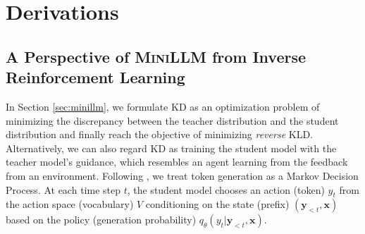 \documentclass{article}
\def\pst{q_{\theta}(y_t | \by_{<t}, \bx)}
\def\bx{\bm{x}}
\def\by{\bm{y}}
\begin{document}



\newpage
\appendix
\section{Derivations}

\subsection{A Perspective of \textsc{MiniLLM} from Inverse Reinforcement Learning}
\label{app:persp_rl}
In Section \ref{sec:minillm}, we formulate KD as an optimization problem of minimizing the discrepancy between the teacher distribution and the student distribution and finally reach the objective of minimizing \textit{reverse} KLD.
Alternatively, we can also regard KD as training the student model with the teacher model's guidance, which resembles an agent learning from the feedback from an environment. Following \cite{cold}, we treat token generation as a Markov Decision Process. At each time step $t$, the student model chooses an action (token) $y_t$ from the action space (vocabulary) $V$ conditioning on the state (prefix) $(\by_{<t},\bx)$ based on the policy (generation probability) $\pst$. 
\end{document}
